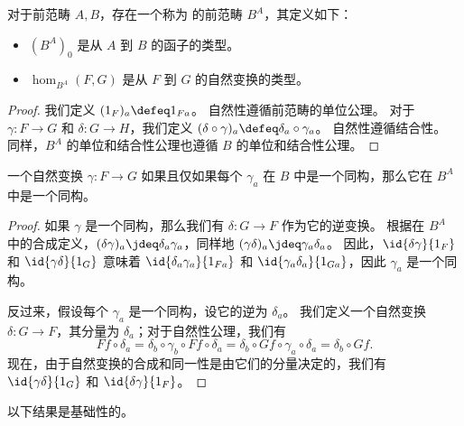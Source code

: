 \begin{defn}\label{ct:functor-precat}
对于前范畴 $A,B$，存在一个称为 的前范畴 $B^A$，其定义如下：
\begin{itemize}
  \item $(B^A)_0$ 是从 $A$ 到 $B$ 的函子的类型。
  \item $\hom_{B^A}(F,G)$ 是从 $F$ 到 $G$ 的自然变换的类型。
\end{itemize}
\end{defn}
\begin{proof}
  我们定义 $(1_F)_a\defeq 1_{Fa}$。
  自然性遵循前范畴的单位公理。
  对于 $\gamma:F\to G$ 和 $\delta:G\to H$，我们定义 $(\delta\circ\gamma)_a\defeq \delta_a\circ \gamma_a$。
  自然性遵循结合性。
  同样，$B^A$ 的单位和结合性公理也遵循 $B$ 的单位和结合性公理。
\end{proof}

\begin{lem}\label{ct:natiso}
一个自然变换 $\gamma:F\to G$ 如果且仅如果每个 $\gamma_a$ 在 $B$ 中是一个同构，那么它在 $B^A$ 中是一个同构。
\end{lem}
\begin{proof}
  如果 $\gamma$ 是一个同构，那么我们有 $\delta:G\to F$ 作为它的逆变换。
  根据在 $B^A$ 中的合成定义，$(\delta\gamma)_a\jdeq \delta_a\gamma_a$，同样地 $(\gamma\delta)_a\jdeq \gamma_a\delta_a$。
  因此，$\id{\delta\gamma}{1_F}$ 和 $\id{\gamma\delta}{1_G}$ 意味着 $\id{\delta_a\gamma_a}{1_{Fa}}$ 和 $\id{\gamma_a\delta_a}{1_{Ga}}$，因此 $\gamma_a$ 是一个同构。

  反过来，假设每个 $\gamma_a$ 是一个同构，设它的逆为 $\delta_a$。
  我们定义一个自然变换 $\delta:G\to F$，其分量为 $\delta_a$；对于自然性公理，我们有
  \[ Ff\circ \delta_a = \delta_b\circ \gamma_b\circ Ff \circ \delta_a = \delta_b\circ Gf\circ \gamma_a\circ \delta_a = \delta_b\circ Gf. \]
  现在，由于自然变换的合成和同一性是由它们的分量决定的，我们有 $\id{\gamma\delta}{1_G}$ 和 $\id{\delta\gamma}{1_F}$。
\end{proof}

以下结果是基础性的。


